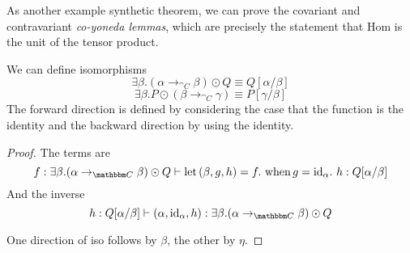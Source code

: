 \documentclass{article}
\begin{document}
As another example synthetic theorem, we can prove the covariant and
contravariant \emph{co-yoneda lemmas}, which are precisely the
statement that Hom is the unit of the tensor product.
\begin{lemma}[CoYoneda]
  We can define isomorphisms
  \[ \exists \beta. (\alpha \to_{\cat C} \beta) \odot Q \equiv Q[\alpha/\beta] \]
  \[ \exists \beta. P \odot (\beta \to_{\cat C} \gamma) \equiv P[\gamma/\beta] \]
  The forward direction is defined by considering the case that the
  function is the identity and the backward direction by using the
  identity.
\end{lemma}
\begin{proof}
  The terms are
  \[ f : \exists \beta. (\alpha\to_{\cat C} \beta) \odot Q \vdash
  \lett (\beta,g,h) = f.~ \when g = \id_{\alpha}.~ h : Q[\alpha/\beta]
  \]
  And the inverse
  \[ h : Q[\alpha/\beta] \vdash (\alpha, \id_{\alpha}, h) : \exists \beta. (\alpha\to_{\cat C}\beta)\odot Q\]

  One direction of iso follows by $\beta$, the other by $\eta$.
\end{proof}
\end{document}
